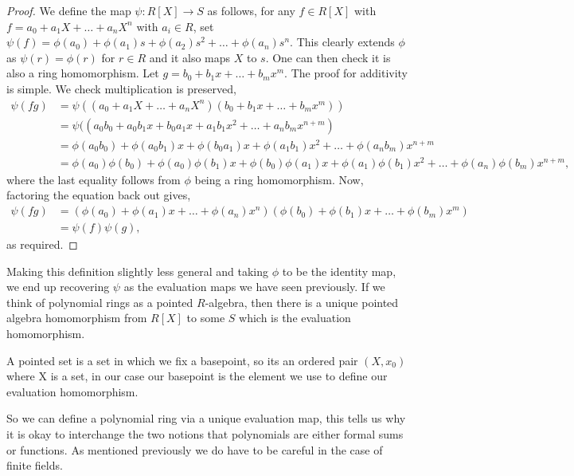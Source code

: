 \begin{proof}
    We define the map $\psi: R[X] \longrightarrow S$ as follows, for any $f \in R[X]$ with $f = a_0 + a_1X + \ldots + a_nX^n$ with $a_i \in R$, set $\psi(f) = \phi\left(a_0\right)+\phi\left(a_1\right) s+\phi\left(a_2\right) s^2+\ldots+\phi\left(a_n\right) s^n$. This clearly extends $\phi$ as $\psi(r) = \phi(r)$ for $r \in R$ and it also maps $X$ to $s$. One can then check it is also a ring homomorphism. Let $g=b_0+b_1x+\ldots +b_mx^m.$ The proof for additivity is simple. We check multiplication is preserved,
    \begin{align*}
        \psi(fg)&=\psi((a_0 + a_1X + \ldots + a_nX^n)(b_0+b_1x+\ldots +b_mx^m))
        \\ &=\psi((a_0b_0+a_0b_1x+b_0a_1x+a_1b_1x^2+\ldots +a_nb_mx^{n+m})
        \\ &= \phi(a_0b_0) +\phi(a_0b_1)x+\phi(b_0a_1)x+\phi(a_1b_1)x^2+\ldots+\phi(a_nb_m)x^{n+m}
        \\ &= \phi(a_0)\phi(b_0)+\phi(a_0)\phi(b_1)x+\phi(b_0)\phi(a_1)x+\phi(a_1)\phi(b_1)x^2+\ldots+\phi(a_n)\phi(b_m)x^{n+m},
    \end{align*}
    where the last equality follows from $\phi$ being a ring homomorphism. Now, factoring the equation back out gives,
    \begin{align*}
        \psi(fg)&=(\phi(a_0)+\phi(a_1)x+\ldots+\phi(a_n)x^n)(\phi(b_0)+\phi(b_1)x+\ldots+\phi(b_m)x^m)
        \\ &=\psi(f)\psi(g),
    \end{align*}
    as required. 
\end{proof}

Making this definition slightly less general and taking $\phi$ to be the identity map, we end up recovering $\psi$ as the evaluation maps we have seen previously. If we think of polynomial rings as a pointed $R$-algebra, then there is a unique pointed algebra homomorphism from $R[X]$ to some $S$ which is the evaluation homomorphism.

\begin{remark}
    A pointed set is a set in which we fix a basepoint, so its an ordered pair $(X, x_0)$ where X is a set, in our case our basepoint is the element we use to define our evaluation homomorphism.
\end{remark}

So we can define a polynomial ring via a unique evaluation map, this tells us why it is okay to interchange the two notions that polynomials are either formal sums or functions. As mentioned previously we do have to be careful in the case of finite fields.

